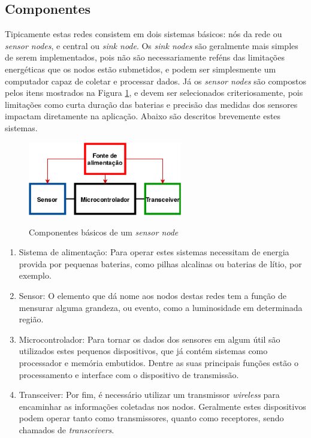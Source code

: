 \documentclass[oneside,openright,12pt]{ufsm_2015} %
\begin{document}
\subsection{Componentes}
Tipicamente estas redes consistem em dois sistemas básicos: nós da rede ou \textit{sensor nodes}, e central ou \textit{sink node}. Os \textit{sink nodes} são geralmente mais simples de serem implementados, pois não são necessariamente reféns das limitações energéticas que os nodos estão submetidos, e podem ser simplesmente um computador capaz de coletar e processar dados. Já os \textit{sensor nodes} são compostos pelos itens mostrados na Figura \ref{fig:sensor-node-components}, e devem ser selecionados criteriosamente, pois limitações como curta duração das baterias e precisão das medidas dos sensores impactam diretamente na aplicação. Abaixo são descritos brevemente estes sistemas.

\begin{figure}[ht]
 	    \caption{\label{exepretex} Componentes básicos de um \textit{sensor node}}
    \centering
    \includegraphics[width=0.6\textwidth]{figuras/sensor-node-components.png}
    \vspace{\baselineskip} %
        \label{fig:sensor-node-components}
\end{figure}

\begin{enumerate}
    \item Sistema de alimentação: Para operar estes sistemas necessitam de energia provida por pequenas baterias, como pilhas alcalinas ou baterias de lítio, por exemplo.
    \item Sensor: O elemento que dá nome aos nodos destas redes tem a função de mensurar alguma grandeza, ou evento, como a luminosidade em determinada região.
    \item Microcontrolador: Para tornar os dados dos sensores em algum útil são utilizados estes pequenos dispositivos, que já contém sistemas como processador e memória embutidos. Dentre as suas principais funções estão o processamento e interface com o dispositivo de transmissão.
    \item Transceiver: Por fim, é necessário utilizar um transmissor \textit{wireless} para encaminhar as informações coletadas nos nodos. Geralmente estes dispositivos podem operar tanto como transmissores, quanto como receptores, sendo chamados de \textit{transceivers}.
\end{enumerate}
\end{document}
